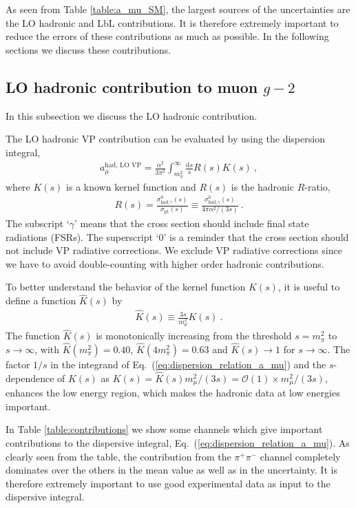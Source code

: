 As seen from Table \ref{table:a_mu_SM}, 
the largest sources of the uncertainties are the
LO hadronic and LbL contributions.  It is therefore
extremely important to reduce the errors of these contributions
as much as possible.
In the following sections we discuss these contributions.

\subsection{LO hadronic contribution to muon $g-2$}

In this subsection we discuss the LO hadronic contribution.

The LO hadronic VP contribution can be evaluated by using
the dispersion integral,
%
\begin{align}
 a_\mu^{\text{had, LO VP}} =
  \frac{\alpha^2}{3\pi^2} \int_{m_\pi^2}^{\infty}
   \frac{\text{d}s}{s} R(s) K(s)~,
\label{eq:dispersion_relation_a_mu}
\end{align}
%
where $K(s)$ is a known kernel function and
$R(s)$ is the hadronic $R$-ratio,
%
\begin{align}
 R(s) =
  \frac{\sigma^0_{\text{had,} \gamma}(s)}{\sigma_{\text{pt}}(s)}
\equiv
  \frac{\sigma^0_{\text{had,} \gamma}(s)}{4\pi \alpha^2/(3s)}~.
\end{align}
%
The subscript `$\gamma$' means that the cross section
should include final state radiations (FSRs).
The superscript `0' is a reminder that the cross section
should not include VP radiative corrections.  We exclude
VP radiative corrections since we have to avoid
double-counting with higher order hadronic contributions.



To better understand the behavior of the kernel function $K(s)$,
it is useful to define a function $\hat{K}(s)$ by
%
\begin{align}
 \hat{K}(s) \equiv \frac{3s}{m_\mu^2}K(s)~.
\end{align}
%
The function $\hat{K}(s)$ is monotonically increasing
from the threshold $s=m_\pi^2$ to $s \to \infty$, 
with $\hat{K}(m_\pi^2)=0.40$, $\hat{K}(4m_\pi^2)=0.63$
and $\hat{K}(s) \to 1$ for $s \to \infty$.
The factor $1/s$ in the integrand of 
Eq.~(\ref{eq:dispersion_relation_a_mu}) and the
$s$-dependence of $K(s)$ as $K(s)= \hat{K}(s) m_\mu^2/(3s)
= {\mathcal O}(1) \times m_\mu^2/(3s)$,
enhances the low energy region, which makes the 
hadronic data at low energies important.


In Table \ref{table:contributions} we show some channels
which give important contributions to the dispersive
integral, Eq.~(\ref{eq:dispersion_relation_a_mu}). 
As clearly seen from the table, the contribution 
from the $\pi^+\pi^-$ channel completely dominates over
the others in the mean value as well as in the uncertainty.
It is therefore extremely important to use good experimental
data as input to the dispersive integral.


